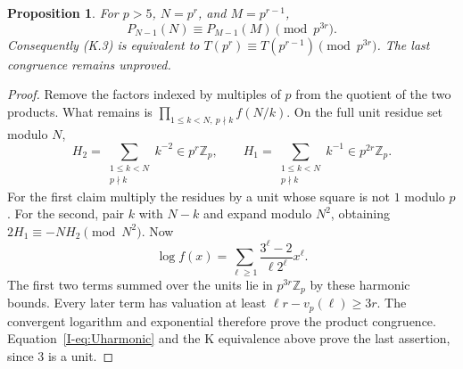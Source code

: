 \documentclass[11pt,letterpaper]{article}
\newtheorem{proposition}[theorem]{Proposition}
\numberwithin{equation}{section}
\begin{document}
\begin{proposition}
For $p>5$, $N=p^r$, and $M=p^{r-1}$,
\[
 P_{N-1}(N)\equiv P_{M-1}(M)\pmod{p^{3r}}.
\]
Consequently (K.3) is equivalent to
$T(p^r)\equiv T(p^{r-1})\pmod{p^{3r}}$.
The last congruence remains unproved.
\end{proposition}
\begin{proof}
Remove the factors indexed by multiples of $p$ from the quotient of
the two products. What remains is $\prod_{1\le k<N,\ p\nmid k}f(N/k)$.
On the full unit residue set modulo $N$,
\[
 H_2=\sum_{\substack{1\le k<N\\p\nmid k}}k^{-2}\in p^r\mathbb Z_p,
 \qquad
 H_1=\sum_{\substack{1\le k<N\\p\nmid k}}k^{-1}\in p^{2r}\mathbb Z_p.
\]
For the first claim multiply the residues by a unit whose square is
not $1$ modulo $p$. For the second, pair $k$ with $N-k$ and expand
modulo $N^2$, obtaining $2H_1\equiv-NH_2\pmod{N^2}$.
Now
\[
 \log f(x)=\sum_{\ell\ge1}\frac{3^\ell-2}{\ell2^\ell}x^\ell.
\]
The first two terms summed over the units lie in $p^{3r}\mathbb Z_p$
by these harmonic bounds. Every later term has valuation at least
$\ell r-v_p(\ell)\ge3r$. The convergent logarithm and exponential
therefore prove the product congruence. Equation~\eqref{I-eq:Uharmonic}
and the K equivalence above prove the last assertion, since $3$ is a unit.
\end{proof}
\end{document}
